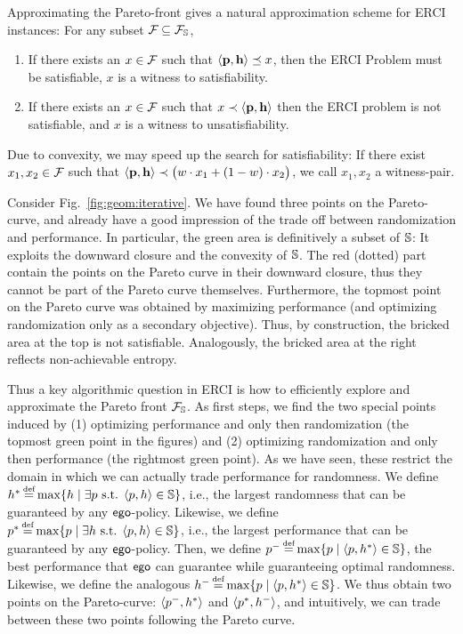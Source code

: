 \noindent
Approximating the Pareto-front gives a natural approximation
scheme for ERCI instances: For any subset $\mathcal{F}_{} \subseteq
\mathcal{F}_{\mathbb{S}}$,
\begin{enumerate}
\item If there exists an $x \in \mathcal{F}_{}$ such that
$\langle \mathbf{p}, \mathbf{h} \rangle \preceq x$, then the ERCI
Problem must be satisfiable, $x$ is a witness to satisfiability.
\item If there exists an $x \in \mathcal{F}_{}$
such that $x \prec \langle \mathbf{p}, \mathbf{h} \rangle$ then the
ERCI problem is not satisfiable, and $x$ is a witness to unsatisfiability.
\end{enumerate}
Due to convexity, we may speed up the search for satisfiability: If there exist $x_1, x_2 \in \mathcal{F}_{}$ such that $\langle \mathbf{p}, \mathbf{h} \rangle \prec \big(w \cdot x_1 + (1-w) \cdot x_2\big)$, we call $x_1,x_2$ a witness-pair.

\begin{example}
\label{ex:approximation}
	Consider Fig.~\ref{fig:geom:iterative}. We have found three points on the Pareto-curve, and already have a good impression of the trade off between randomization and performance. In particular, the green area is definitively a subset of $\mathbb{S}$: It exploits the downward closure and the convexity of $\mathbb{S}$. The red (dotted) part contain the points on the Pareto curve in their downward closure, thus they cannot be part of the Pareto curve themselves.
	Furthermore, the topmost point on the Pareto curve was obtained by maximizing performance (and optimizing randomization only as a secondary objective). Thus, by construction, the bricked area at the top is not satisfiable. Analogously, the bricked area at the right reflects non-achievable entropy. 
\end{example}

Thus a key algorithmic question in ERCI is how to efficiently explore
and approximate the Pareto front $\mathcal{F}_{\mathbb{S}}$. As first steps, we find the two special points induced by (1) optimizing performance and only then randomization (the topmost green point in the figures) and (2) optimizing randomization and only then performance (the rightmost green point). 
As we have seen, these restrict the domain in which we can actually trade performance for randomness. 
We define 
$\rndopt \eqdef \max \{ \rndp \mid \exists \scp \text{ s.t. } \langle \scp, \rndp \rangle \in \solutions  \} $, i.e., the largest randomness that can be guaranteed by any $\mathsf{ego}$-policy. 
Likewise, we define 
$\scopt \eqdef \max \{ \scp \mid \exists \rndp \text{ s.t. } \langle \scp, \rndp \rangle \in \solutions  \} $, i.e., the largest performance that can be guaranteed by any $\mathsf{ego}$-policy. 
Then, we define 
$\scmin \eqdef \max \{ \scp \mid \langle \scp, \rndopt \rangle  \in \solutions \}$, the best performance that $\mathsf{ego}$ can guarantee while guaranteeing optimal randomness. 
Likewise, we define  the analogous $\rndmin \eqdef \max \{ \scp \mid \langle \scp, \rndopt \rangle  \in \solutions \}$.
We thus obtain two points on the Pareto-curve: $\langle p^{-}, h^{*} \rangle$ and $\langle p^{*}, h^{-} \rangle$, and intuitively, we can trade between these two points following the Pareto curve.

